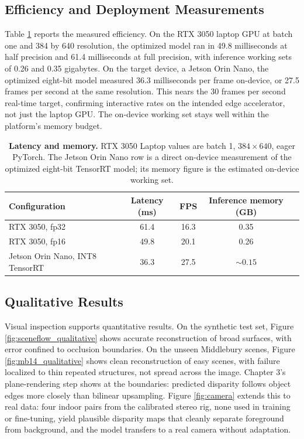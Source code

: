 \subsection{Efficiency and Deployment Measurements}
Table \ref{tab:latency} reports the measured efficiency. On the RTX 3050
laptop GPU at batch one and 384 by 640 resolution, the optimized model ran
in 49.8 milliseconds at half precision and 61.4 milliseconds at full
precision, with inference working sets of 0.26 and 0.35 gigabytes. On the
target device, a Jetson Orin Nano, the optimized eight-bit model measured
36.3 milliseconds per frame on-device, or 27.5 frames per second at the
same resolution. This nears the 30 frames per second real-time target,
confirming interactive rates on the intended edge accelerator, not just
the laptop GPU. The on-device working set stays well within the
platform's memory budget.

\begin{table}[!htbp]
\centering
\caption{\textbf{Latency and memory.} RTX 3050 Laptop values are batch 1, $384\times 640$, eager PyTorch. The Jetson Orin Nano row is a direct on-device measurement of the optimized eight-bit TensorRT model; its memory figure is the estimated on-device working set.}
\label{tab:latency}
\small
\begin{tabular}{lcccc}
\toprule
Configuration & Latency (ms) & FPS & Inference memory (GB)\\
\midrule
RTX 3050, fp32 & 61.4 & 16.3 & 0.35\\
RTX 3050, fp16 & 49.8 & 20.1 & 0.26\\
Jetson Orin Nano, INT8 TensorRT & 36.3 & 27.5 & ${\sim}0.15$\\
\bottomrule
\end{tabular}
\end{table}

\FloatBarrier
\subsection{Qualitative Results}
Visual inspection supports quantitative results. On the synthetic test
set, Figure \ref{fig:sceneflow_qualitative} shows accurate reconstruction
of broad surfaces, with error confined to occlusion boundaries. On the
unseen Middlebury scenes, Figure \ref{fig:mb14_qualitative} shows clean
reconstruction of easy scenes, with failure localized to thin repeated
structures, not spread across the image. Chapter 3's plane-rendering step
shows at the boundaries: predicted disparity follows object edges more
closely than bilinear upsampling. Figure \ref{fig:camera} extends this to
real data: four indoor pairs from the calibrated stereo rig, none used in
training or fine-tuning, yield plausible disparity maps that cleanly
separate foreground from background, and the model transfers to a real
camera without adaptation.

